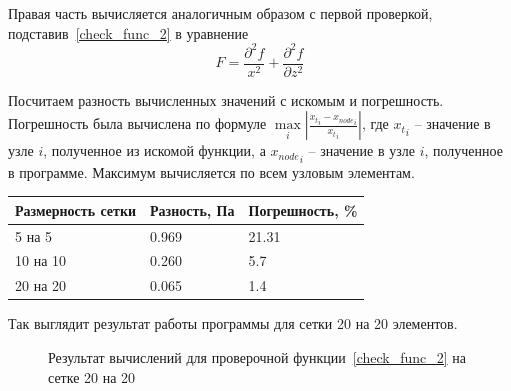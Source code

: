 \documentclass[a4paper,14pt]{extarticle}
\begin{document}
Правая часть вычисляется аналогичным образом с первой проверкой, подставив~\eqref{check_func_2} в уравнение
\begin{equation*}
	F = \frac{\partial^2 f}{x^2} + \frac{\partial^2 f}{\partial z^2}
\end{equation*} 

Посчитаем разность вычисленных значений с искомым и погрешность. Погрешность была вычислена по формуле $\underset{i}{\max} | \frac{{x_t}_i - {x_{node}}_i}{{x_t}_i} |$, где ${x_t}_i$ -- значение в узле $i$, полученное из искомой функции, а ${x_{node}}_i$ -- значение в узле $i$, полученное в программе. Максимум вычисляется по всем узловым элементам.

\begin{table}[!htbp]
	\begin{tabular}{|l|l|l|}
		\hline
		\multicolumn{1}{|c|}{Размерность сетки} & \multicolumn{1}{c|}{Разность, Па} & Погрешность, \% \\ \hline
		5 на 5                                  & 0.969                              & 21.31            \\ \hline
		10 на 10                                & 0.260                              & 5.7            \\ \hline
		20 на 20                                & 0.065                              & 1.4            \\ \hline
	\end{tabular}
\end{table}

\newpage
Так выглядит результат работы программы для сетки 20 на 20 элементов.
\begin{figure}[!htbp]
	\caption{Результат вычислений для проверочной функции~\eqref{check_func_2} на сетке 20 на 20}
	\label{res_check_func_2}
\end{figure}
\end{document}
